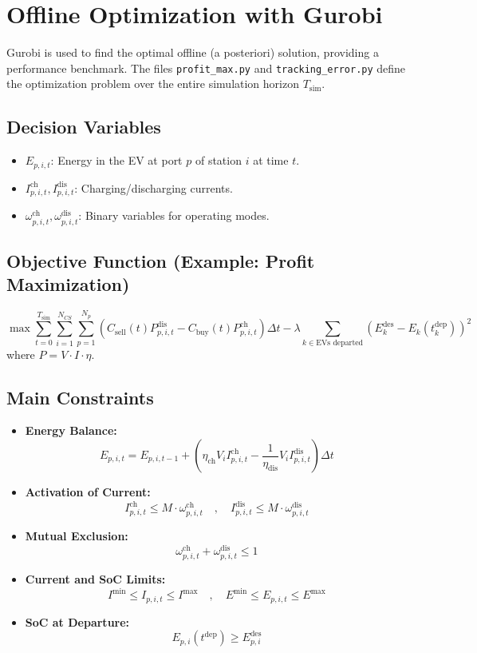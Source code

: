 \section{Offline Optimization with Gurobi}
Gurobi is used to find the optimal offline (a posteriori) solution, providing a performance benchmark. The files \texttt{profit\_max.py} and \texttt{tracking\_error.py} define the optimization problem over the entire simulation horizon $T_{\text{sim}}$.

\subsection{Decision Variables}
\begin{itemize}
    \item $E_{p,i,t}$: Energy in the EV at port $p$ of station $i$ at time $t$.
    \item $I^{\text{ch}}_{p,i,t}, I^{\text{dis}}_{p,i,t}$: Charging/discharging currents.
    \item $\omega^{\text{ch}}_{p,i,t}, \omega^{\text{dis}}_{p,i,t}$: Binary variables for operating modes.
\end{itemize}

\subsection{Objective Function (Example: Profit Maximization)}
\[
\max \sum_{t=0}^{T_{\text{sim}}} \sum_{i=1}^{N_{CS}} \sum_{p=1}^{N_p} \left( C_{\text{sell}}(t) P^{\text{dis}}_{p,i,t} - C_{\text{buy}}(t) P^{\text{ch}}_{p,i,t} \right) \Delta t - \lambda \sum_{k \in \text{EVs departed}} (E_k^{\text{des}} - E_k(t_k^{\text{dep}}))^2
\]
where $P = V \cdot I \cdot \eta$.

\subsection{Main Constraints}
\begin{itemize}
    \item \textbf{Energy Balance:}
    \[
    E_{p,i,t} = E_{p,i,t-1} + (\eta_{\text{ch}} V_i I^{\text{ch}}_{p,i,t} - \frac{1}{\eta_{\text{dis}}} V_i I^{\text{dis}}_{p,i,t}) \Delta t
    \]
    \item \textbf{Activation of Current:}
    \[
    I^{\text{ch}}_{p,i,t} \le M \cdot \omega^{\text{ch}}_{p,i,t} \quad , \quad I^{\text{dis}}_{p,i,t} \le M \cdot \omega^{\text{dis}}_{p,i,t}
    \]
    \item \textbf{Mutual Exclusion:}
    \[
    \omega^{\text{ch}}_{p,i,t} + \omega^{\text{dis}}_{p,i,t} \le 1
    \]
    \item \textbf{Current and SoC Limits:}
    \[
    I^{\text{min}} \le I_{p,i,t} \le I^{\text{max}} \quad , \quad E^{\text{min}} \le E_{p,i,t} \le E^{\text{max}}
    \]
    \item \textbf{SoC at Departure:}
    \[
    E_{p,i}(t^{\text{dep}}) \ge E^{\text{des}}_{p,i}
    \]
\end{itemize}